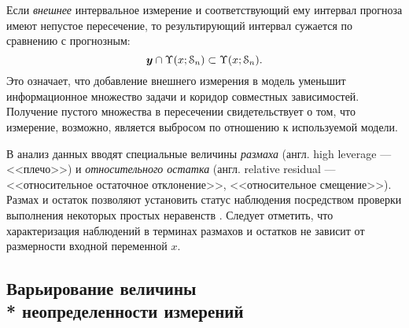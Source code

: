 \documentclass[a5paper,openany]{book}
\newcommand{\mbf}[1]{\protect\text{\boldmath$#1$}}
\newcommand{\eus}{\EuScript}
\begin{document}
Если \emph{внешнее} интервальное измерение и соответствующий ему интервал прогноза имеют 
непустое пересечение, то результирующий интервал сужается по сравнению с прогнозным:  
\begin{equation*}
	\mbf{y} \cap \Upsilon(x; \eus{S}_{n}) \subset \Upsilon(x;\eus{S}_{n}).
\end{equation*}
Это означает, что добавление внешнего измерения в модель уменьшит информационное 
множество задачи и коридор совместных зависимостей. Получение пустого множества 
в пересечении свидетельствует о том, что измерение, возможно, является выбросом 
по отношению к используемой модели. 

В анализ данных вводят специальные величины \emph{размаха} (англ. high leverage --- <<плечо>>)  и \emph{относительного остатка} (англ. relative residual --- <<относительное остаточное отклонение>>,  <<относительное смещение>>).
Размах и остаток позволяют установить статус наблюдения посредством проверки выполнения некоторых простых неравенств \cite{MetodikaBook}. 
Следует отметить, что характеризация наблюдений в терминах размахов и остатков не зависит 
от размерности входной переменной $x$. 

\subsection[Варьирование неопределенности измерений]%
{Варьирование величины \\*  неопределенности измерений} 
\label{VaryUncertSect}            
\end{document}
